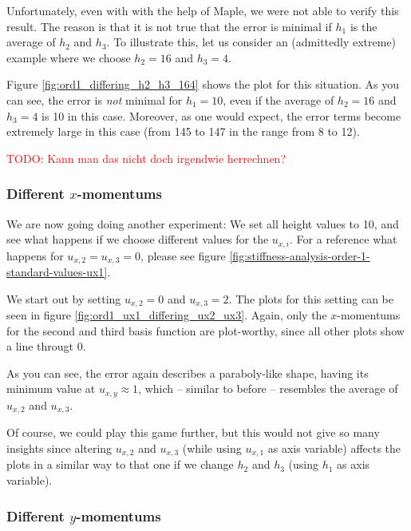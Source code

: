 \documentclass{article}
\newcommand{\todo}[1]{\textcolor{red}{TODO: #1}}
\begin{document}
Unfortunately, even with with the help of Maple, we were not able to verify this result. The reason is that it is not true that the error is minimal if $h_1$ is the average of $h_2$ and $h_3$. To illustrate this, let us consider an (admittedly extreme) example where we choose $h_2=16$ and $h_3=4$.



Figure \ref{fig:ord1_differing_h2_h3_164} shows the plot for this situation. As you can see, the error is \emph{not} minimal for $h_1=10$, even if the average of $h_2=16$ and $h_3=4$ is 10 in this case. Moreover, as one would expect, the error terms become extremely large in this case (from 145 to 147 in the range from 8 to 12).

\todo{Kann man das nicht doch irgendwie herrechnen?}

\subsubsection{Different $x$-momentums}
\label{sec:stiffness-analysis-ord1-nonstandard-diff-ux}

We are now going doing another experiment: We set all height values to 10, and see what happens if we choose different values for the $u_{x,i}$. For a reference what happens for $u_{x,2}=u_{x,3}=0$, please see figure \ref{fig:stiffness-analysis-order-1-standard-values-ux1}.

We start out by setting $u_{x,2}=0$ and $u_{x,3}=2$. The plots for this setting can be seen in figure \ref{fig:ord1_ux1_differing_ux2_ux3}. Again, only the $x$-momentums for the second and third basis function are plot-worthy, since all other plots show a line througt 0.



As you can see, the error again describes a paraboly-like shape, having its minimum value at $u_{x,y}\approx 1$, which -- similar to before -- resembles the average of $u_{x,2}$ and $u_{x,3}$.

Of course, we could play this game further, but this would not give so many insights since altering $u_{x,2}$ and $u_{x,3}$ (while using $u_{x,1}$ as axis variable) affects the plots in a similar way to that one if we change $h_2$ and $h_3$ (using $h_1$ as axis variable).

\subsubsection{Different $y$-momentums}
\label{sec:stiffness-analysis-ord1-nonstandard-diff-uy}
\end{document}
